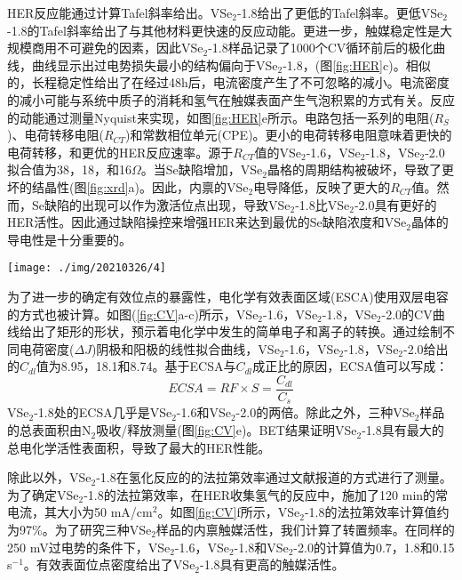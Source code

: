 \documentclass[reprint, aps, prb, showkeys]{revtex4-2}
\begin{document}
HER反应能通过计算Tafel斜率给出。VSe$_2$-1.8给出了更低的Tafel斜率。更低VSe$_2$-1.8的Tafel斜率给出了与其他材料更快速的反应动能。更进一步，触媒稳定性是大规模商用不可避免的因素，因此VSe$_2$-1.8样品记录了1000个CV循环前后的极化曲线，曲线显示出过电势损失最小的结构偏向于VSe$_2$-1.8，(图\ref{fig:HER}c)。相似的，长程稳定性给出了在经过48h后，电流密度产生了不可忽略的减小。电流密度的减小可能与系统中质子的消耗和氢气在触媒表面产生气泡积累的方式有关。反应的动能通过测量Nyquist来实现，如图\ref{fig:HER}e所示。电路包括一系列的电阻($R_S$)、电荷转移电阻($R_{CT}$)和常数相位单元(CPE)。更小的电荷转移电阻意味着更快的电荷转移，和更优的HER反应速率。源于$R_{CT}$值的VSe$_2$-1.6，VSe$_2$-1.8，VSe$_2$-2.0拟合值为38，18，和16$\Omega$。当Se缺陷增加，VSe$_2$晶格的周期结构被破坏，导致了更坏的结晶性(图\ref{fig:xrd}a)。因此，内禀的VSe$_2$电导降低，反映了更大的$R_{CT}$值。然而，Se缺陷的出现可以作为激活位点出现，导致VSe$_2$-1.8比VSe$_2$-2.0具有更好的HER活性。因此通过缺陷操控来增强HER来达到最优的Se缺陷浓度和VSe$_2$晶体的导电性是十分重要的。
\begin{figure*}[t]
    \texttt{[image: ./img/20210326/4]}
    \caption{\label{fig:CV} 
    不同VSe$_2$配比的CV(Cyclic voltammogram)曲线。(a)VSe$_2$-1.6, (b)VSe$_2$-1.8, (c)VSe$_2$-2.0。(d)VSe$_2$-1.6，VSe$_2$-1.8和VSe$_2$-2.0的双层电容值；(e)N$_2$的吸收-释放曲线；(f)H$_2$的理论与实际数量曲线。
    }
\end{figure*}

为了进一步的确定有效位点的暴露性，电化学有效表面区域(ESCA)使用双层电容的方式也被计算。如图(\ref{fig:CV}a-c)所示，VSe$_2$-1.6，VSe$_2$-1.8，VSe$_2$-2.0的CV曲线给出了矩形的形状，预示着电化学中发生的简单电子和离子的转换。通过绘制不同电荷密度($\Delta J$)阴极和阳极的线性拟合曲线，VSe$_2$-1.6，VSe$_2$-1.8，VSe$_2$-2.0给出的$C_{dl}$值为8.95，18.1和8.74。基于ECSA与$C_{dl}$成正比的原因，ECSA值可以写成：
\begin{equation}
    ECSA = RF \times S = \frac{C_{dl}}{C_s}
\end{equation}
VSe$_2$-1.8处的ECSA几乎是VSe$_2$-1.6和VSe$_2$-2.0的两倍。除此之外，三种VSe$_2$样品的总表面积由N$_2$吸收/释放测量(图\ref{fig:CV}e)。BET结果证明VSe$_2$-1.8具有最大的总电化学活性表面积，导致了最大的HER性能。

除此以外，VSe$_2$-1.8在氢化反应的的法拉第效率通过文献报道的方式进行了测量。为了确定VSe$_2$-1.8的法拉第效率，在HER收集氢气的反应中，施加了120 min的常电流，其大小为50 mA/cm$^2$。如图\ref{fig:CV}f所示，VSe$_2$-1.8的法拉第效率计算值约为97\%。为了研究三种VSe$_2$样品的内禀触媒活性，我们计算了转置频率。在同样的250 mV过电势的条件下，VSe$_2$-1.6，VSe$_2$-1.8和VSe$_2$-2.0的计算值为0.7，1.8和0.15 s$^{-1}$。有效表面位点密度给出了VSe$_2$-1.8具有更高的触媒活性。
\end{document}
